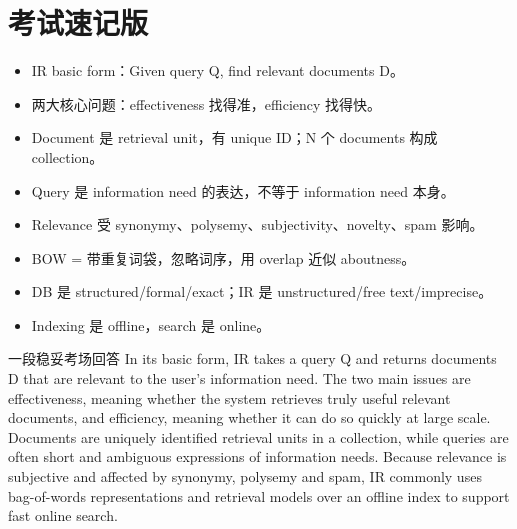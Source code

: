 \documentclass[11pt,a4paper]{ctexart}
\begin{document}
\section{考试速记版}
\begin{itemize}
\item IR basic form：Given query Q, find relevant documents D。
\item 两大核心问题：effectiveness 找得准，efficiency 找得快。
\item Document 是 retrieval unit，有 unique ID；N 个 documents 构成 collection。
\item Query 是 information need 的表达，不等于 information need 本身。
\item Relevance 受 synonymy、polysemy、subjectivity、novelty、spam 影响。
\item BOW = 带重复词袋，忽略词序，用 overlap 近似 aboutness。
\item DB 是 structured/formal/exact；IR 是 unstructured/free text/imprecise。
\item Indexing 是 offline，search 是 online。
\end{itemize}
\begin{callout}{一段稳妥考场回答}
In its basic form, IR takes a query Q and returns documents D that are relevant to the user's information need. The two main issues are effectiveness, meaning whether the system retrieves truly useful relevant documents, and efficiency, meaning whether it can do so quickly at large scale. Documents are uniquely identified retrieval units in a collection, while queries are often short and ambiguous expressions of information needs. Because relevance is subjective and affected by synonymy, polysemy and spam, IR commonly uses bag-of-words representations and retrieval models over an offline index to support fast online search.
\end{callout}
\end{document}

